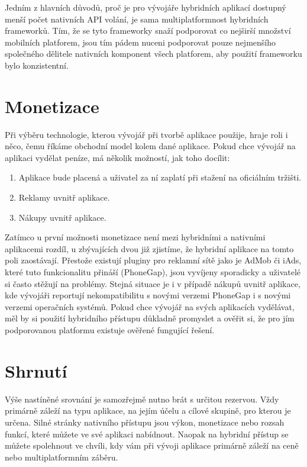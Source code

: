 Jedním z hlavních důvodů, proč je pro vývojáře hybridních aplikací dostupný menší počet nativních API volání, je sama multiplatformnost hybridních frameworků. Tím, že se tyto frameworky snaží podporovat co nejširší množství mobilních platforem, jsou tím pádem nuceni podporovat pouze nejmenšího společného dělitele nativních komponent všech platforem, aby použití frameworku bylo konzistentní.

\section{Monetizace}
Při výběru technologie, kterou vývojář při tvorbě aplikace použije, hraje roli i něco, čemu říkáme obchodní model kolem dané aplikace. Pokud chce vývojář na aplikaci vydělat peníze, má několik možností, jak toho docílit:

\begin{enumerate}
	\item Aplikace bude placená a uživatel za ní zaplatí při stažení na oficiálním tržišti.
	\item Reklamy uvnitř aplikace.
	\item Nákupy uvnitř aplikace.
\end{enumerate}

Zatímco u první možnosti monetizace není mezi hybridními a nativními aplikacemi rozdíl, u zbývajících dvou již zjistíme, že hybridní aplikace na tomto poli zaostávají. Přestože existují pluginy pro reklamní sítě jako je AdMob či iAds, které tuto funkcionalitu přináší (PhoneGap), jsou vyvíjeny sporadicky a uživatelé si často stěžují na problémy. Stejná situace je i v případě nákupů uvnitř aplikace, kde vývojáři reportují nekompatibilitu s novými verzemi PhoneGap i s novými verzemi operačních systémů. Pokud chce vývojář na svých aplikacích vydělávat, měl by si použití hybridního přístupu důkladně promyslet a ověřit si, že pro jím podporovanou platformu existuje ověřené fungující řešení.

\section{Shrnutí}
Výše nastíněné srovnání je samozřejmě nutno brát s určitou rezervou. Vždy primárně záleží na typu aplikace, na jejím účelu a cílové skupině, pro kterou je určena. Silné stránky nativního přístupu jsou výkon, monetizace nebo rozsah funkcí, které můžete ve své aplikaci nabídnout. Naopak na hybridní přístup se můžete spolehnout ve chvíli, kdy vám při vývoji aplikace primárně záleží na ceně nebo multiplatformním záběru.


